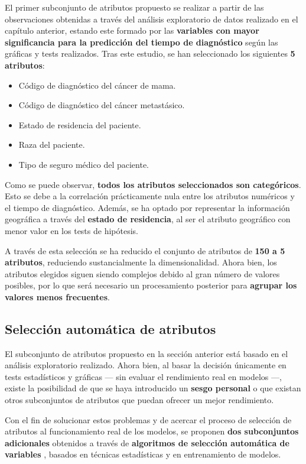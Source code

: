 El primer subconjunto de atributos propuesto se realizar a partir de las observaciones obtenidas a través del análisis exploratorio de datos realizado en el capítulo anterior, estando este formado por las \textbf{variables con mayor significancia para la predicción del tiempo de diagnóstico} según las gráficas y tests realizados. Tras este estudio, se han seleccionado los siguientes \textbf{5 atributos}:

\begin{itemize}[parsep=1pt, itemsep=1pt, topsep=2pt]
	\item Código de diagnóstico del cáncer de mama.
	\item Código de diagnóstico del cáncer metastásico.
	\item Estado de residencia del paciente.
	\item Raza del paciente.
	\item Tipo de seguro médico del paciente.
\end{itemize}

Como se puede observar, \textbf{todos los atributos seleccionados son categóricos}. Esto se debe a la correlación prácticamente nula entre los atributos numéricos y el tiempo de diagnóstico. Además, se ha optado por representar la información geográfica a través del \textbf{estado de residencia}, al ser el atributo geográfico con menor valor en los tests de hipótesis.

A través de esta selección se ha reducido el conjunto de atributos de \textbf{150 a 5 atributos}, reduciendo sustancialmente la dimensionalidad. Ahora bien, los atributos elegidos siguen siendo complejos debido al gran número de valores posibles, por lo que será necesario un procesamiento posterior para \textbf{agrupar los valores menos frecuentes}.

\subsection{Selección automática de atributos}

El subconjunto de atributos propuesto en la sección anterior está basado en el análisis exploratorio realizado. Ahora bien, al basar la decisión únicamente en tests estadísticos y gráficas --- sin evaluar el rendimiento real en modelos ---, existe la posibilidad de que se haya introducido un \textbf{sesgo personal} o que existan otros subconjuntos de atributos que puedan ofrecer un mejor rendimiento.

Con el fin de solucionar estos problemas y de acercar el proceso de selección de atributos al funcionamiento real de los modelos, se proponen \textbf{dos subconjuntos adicionales} obtenidos a través de \textbf{algoritmos de selección automática de variables} \cite{featureselection}, basados en técnicas estadísticas y en entrenamiento de modelos.

